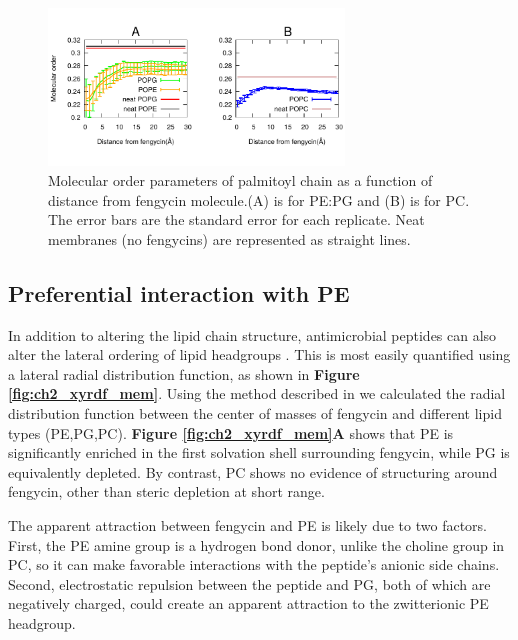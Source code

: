 \begin{figure}
\centering
\includegraphics[width=0.7\textwidth]{chapter2_figs/dibmop_corr.pdf}
\caption{\label{fig:ch2_dibmop}Molecular order parameters of palmitoyl chain as a
function of distance from fengycin molecule.(A) is for PE:PG and (B) is for PC.
The error bars are the standard error for each replicate. Neat membranes (no
fengycins) are represented as straight lines.}
\end{figure}


\subsection{Preferential interaction with PE}
\label{subsec:xyrdf_feng_lipid}

In addition to altering the lipid chain structure, antimicrobial peptides can
also alter the lateral ordering of lipid headgroups .\cite{Epand2012,Epand2009}
 This is most easily quantified using a lateral
radial distribution function, as shown in \textbf{Figure \ref{fig:ch2_xyrdf_mem}}. Using the method described in \textbf{}
we calculated the radial distribution function between the center of masses of fengycin and different lipid types (PE,PG,PC).
\textbf{Figure \ref{fig:ch2_xyrdf_mem}A} shows that PE is significantly enriched in the first solvation shell surrounding fengycin,
while PG is equivalently depleted. By contrast, PC shows no evidence of structuring
around fengycin, other than steric depletion at short range.

The apparent attraction between fengycin and PE is likely due to two factors.
First, the PE amine group is a hydrogen bond donor, unlike the choline group in
PC, so it can make favorable interactions with the peptide's anionic side
chains.
Second, electrostatic repulsion between the peptide and PG, both of
which are negatively charged, could create an apparent attraction to the zwitterionic PE headgroup.

